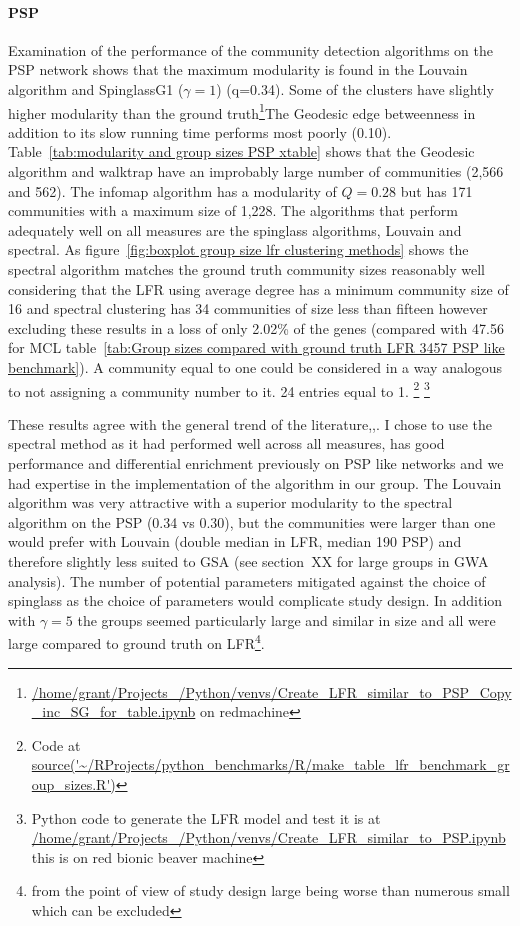 \paragraph{PSP} Examination of the performance of the community detection algorithms on the PSP network shows that the maximum modularity is found in the Louvain algorithm and SpinglassG1 ($\gamma=1$) (q=0.34). 
Some of the clusters have slightly higher modularity than the ground truth\footnote{\url{/home/grant/Projects_/Python/venvs/Create_LFR_similar_to_PSP_Copy_inc_SG_for_table.ipynb} on redmachine}The Geodesic edge betweenness in addition to its slow running time performs most poorly (0.10). Table~\ref{tab:modularity and group sizes PSP xtable} shows that the Geodesic algorithm and walktrap have an improbably large number of communities (2,566 and 562). The infomap algorithm has a modularity of $Q=0.28$ but has 171 communities with a maximum size of 1,228. The algorithms that perform adequately well on all measures are the spinglass algorithms, Louvain and spectral. As figure~\ref{fig:boxplot group size lfr clustering methods} shows the spectral algorithm matches the ground truth community sizes reasonably well considering that the LFR using average degree has a minimum community size of 16 and spectral clustering has 34 communities of size less than fifteen however excluding these results in a loss of only 2.02\% of the genes (compared with 47.56 for MCL table~\ref{tab:Group sizes compared with ground truth LFR 3457 PSP like benchmark}). A community equal to one could be considered in a way analogous to not assigning a community number to it. 24 entries equal to 1. \footnote{Code at \url{source('~/RProjects/python_benchmarks/R/make_table_lfr_benchmark_group_sizes.R')}}
\footnote{Python code to generate the LFR model and test it is at \url{/home/grant/Projects_/Python/venvs/Create_LFR_similar_to_PSP.ipynb} this is on red bionic beaver machine}


These results agree with the general trend of the literature\cite{yang2016comparative},\cite{newman2018networks},\cite{fortunato2016community}. I chose to use the spectral method as it had performed well across all measures, has good performance and differential enrichment previously on PSP like networks\cite{mclean2016improved} and we had expertise in the implementation of the algorithm in our group. The Louvain algorithm was very attractive with a superior modularity to the spectral algorithm on the PSP (0.34 vs 0.30), but the communities were larger than one would prefer with Louvain (double median in LFR, median 190 PSP) and therefore slightly less suited to GSA (see section~XX for large groups in GWA analysis). The number of  potential parameters mitigated against the choice of spinglass as the choice of parameters would complicate study design. In addition with $\gamma=5$ the groups seemed particularly large and similar in size and all were large compared to ground truth on LFR\footnote{from the point of view of study design large being worse than numerous small which can be excluded}.








